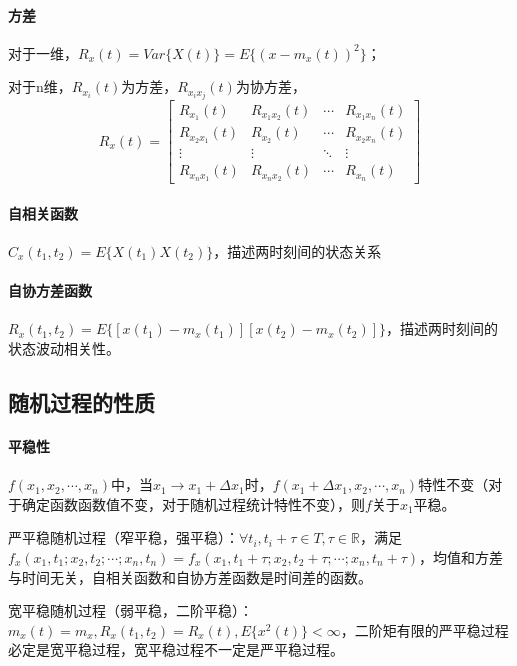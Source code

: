 \documentclass[11pt,a4paper]{ctexart}
\begin{document}
        \paragraph{方差}\leavevmode
        
        对于一维，$R_x(t)=Var\{X(t)\}=E\{(x-m_x(t))^2\}$；
        
        对于n维，$R_{x_i}(t)$为方差，$R_{x_ix_j}(t)$为协方差，
        \[
        R_x(t)=\begin{bmatrix}R_{x_1}(t)&R_{x_1x_2}(t)&\cdots&R_{x_1x_n}(t)\\R_{x_2x_1}(t)&R_{x_2}(t)&\cdots&R_{x_2x_n}(t)\\\vdots&\vdots&\ddots&\vdots\\R_{x_nx_1}(t)&R_{x_nx_2}(t)&\cdots&R_{x_n}(t)\end{bmatrix}
        \]

        \paragraph{自相关函数}\leavevmode
        
        $C_x(t_1,t_2)=E\{X(t_1)X(t_2)\}$，描述两时刻间的状态关系

        \paragraph{自协方差函数}\leavevmode
        
        $R_x(t_1,t_2)=E\{[x(t_1)-m_x(t_1)][x(t_2)-m_x(t_2)]\}$，描述两时刻间的状态波动相关性。
    \subsection{随机过程的性质}
        \paragraph{平稳性}\leavevmode
        
        $f(x_1,x_2,\cdots,x_n)$中，当$x_1\rightarrow x_1+\Delta x_1$时，$f(x_1+\Delta x_1,x_2,\cdots,x_n)$特性不变（对于确定函数函数值不变，对于随机过程统计特性不变），则$f$关于$x_1$平稳。

        严平稳随机过程（窄平稳，强平稳）：$\forall t_i,t_i+\tau\in T,\tau\in\mathbb{R}$，满足$f_x(x_1,t_1;x_2,t_2;\cdots;x_n,t_n)=f_x(x_1,t_1+\tau;x_2,t_2+\tau;\cdots;x_n,t_n+\tau)$，均值和方差与时间无关，自相关函数和自协方差函数是时间差的函数。

        宽平稳随机过程（弱平稳，二阶平稳）：$m_x(t)=m_x,R_x(t_1,t_2)=R_x(t),E\{x^2(t)\}<\infty$，二阶矩有限的严平稳过程必定是宽平稳过程，宽平稳过程不一定是严平稳过程。
\end{document}
